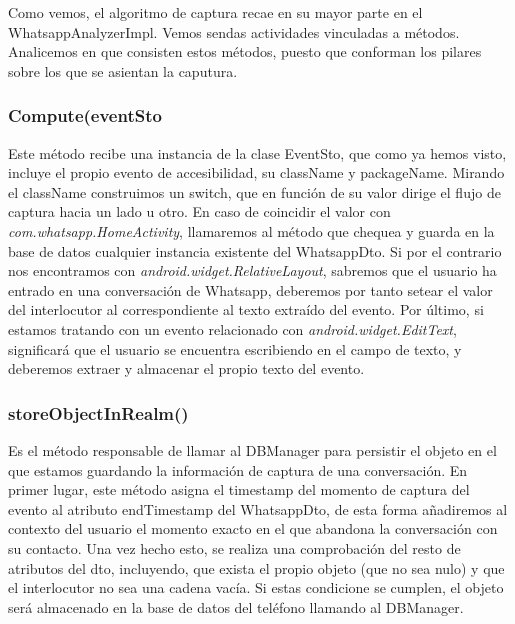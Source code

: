 \documentclass[12pt,a4paper,oneside]{book} %
\begin{document}
Como vemos, el algoritmo de captura recae en su mayor parte en el WhatsappAnalyzerImpl. Vemos sendas actividades vinculadas a métodos. Analicemos en que consisten estos métodos, puesto que conforman los pilares sobre los que se asientan la caputura. 
\subsubsection{Compute(eventSto}
Este método recibe una instancia de la clase EventSto, que como ya hemos visto, incluye el propio evento de accesibilidad, su className y packageName. 
\newline \newline 
Mirando el className construimos un switch, que en función de su valor dirige el flujo de captura hacia un lado u otro. 
\newline \newline
En caso de coincidir el valor con \textit{com.whatsapp.HomeActivity}, llamaremos al método que chequea y guarda en la base de datos cualquier instancia existente del WhatsappDto. 
\newline \newline 
Si por el contrario nos encontramos con \textit{android.widget.RelativeLayout}, sabremos que el usuario ha entrado en una conversación de Whatsapp, deberemos por tanto setear el valor del interlocutor al correspondiente al texto extraído del evento. 
\newline \newline 
Por último, si estamos tratando con un evento relacionado con \textit{android.widget.EditText}, significará que el usuario se encuentra escribiendo en el campo de texto, y deberemos extraer y almacenar el propio texto del evento. 
\subsubsection{storeObjectInRealm()}
Es el método responsable de llamar al DBManager para persistir el objeto en el que estamos guardando la información de captura de una conversación. 
\newline \newline 
En primer lugar, este método asigna el timestamp del momento de captura del evento al atributo endTimestamp del WhatsappDto, de esta forma añadiremos al contexto del usuario el momento exacto en el que abandona la conversación con su contacto. 
\newline \newline 
Una vez hecho esto, se realiza una comprobación del resto de atributos del dto, incluyendo, que exista el propio objeto (que no sea nulo) y que el interlocutor no sea una cadena vacía. Si estas condicione se cumplen, el objeto será almacenado en la base de datos del teléfono llamando al DBManager. 
\end{document}
